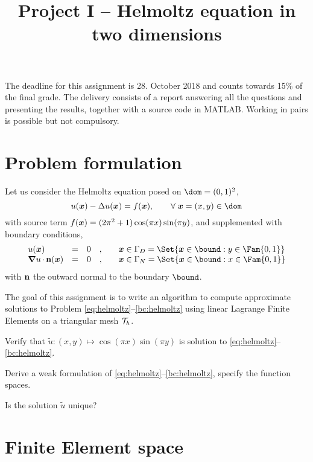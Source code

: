 \documentclass[assignment]{tmanotes}
\title{Project I -- Helmoltz equation in two dimensions}
\date{}
\begin{document}
\maketitle

The deadline for this assignment is 28. October 2018 and counts towards 15\% of the final grade.
The delivery consists of a report answering all the questions and presenting the results, together with a source code in MATLAB.
Working in pairs is possible but not compulsory.

\section{Problem formulation}

Let us consider the Helmoltz equation posed on $\dom = (0,1)^2$,
\begin{equation}\label{eq:helmoltz}
u(\xx) - \Delta u(\xx) = f(\xx), \qquad \forany \xx = (x,y)\in\dom
\end{equation}
with source term $f({{\boldsymbol x}}) = (2\pi^2 + 1)\cos(\pi x)\sin(\pi y)$, and supplemented with boundary conditions,
\begin{equation}\label{bc:helmoltz}
\begin{array}{lcccl}
u(\xx)              &=& 0 &,&\quad \xx\in\Gamma_D = \Set{\xx\in\bound : y \in \Fam{0,1}}\\
\Grad u\xDot\n(\xx) &=& 0 &,&\quad \xx\in\Gamma_N = \Set{\xx\in\bound : x \in \Fam{0,1}}\\
\end{array}
\end{equation}
with $\mathbf n$ the outward normal to the boundary $\bound$.

\medskip
The goal of this assignment is to write an algorithm to compute approximate solutions to Problem \eqref{eq:helmoltz}--\eqref{bc:helmoltz} using linear Lagrange Finite Elements on a triangular mesh ${\mathcal T}_h$.

\medskip
\begin{tmatsks}
\item Verify that $\tilde u: (x,y) \mapsto \cos(\pi x)\sin(\pi y)$ is solution to \eqref{eq:helmoltz}--\eqref{bc:helmoltz}.
\item Derive a weak formulation of \eqref{eq:helmoltz}--\eqref{bc:helmoltz}, specify the function spaces.
\item Is the solution $\tilde u$ unique?
\end{tmatsks}

\section{Finite Element space}
\end{document}
